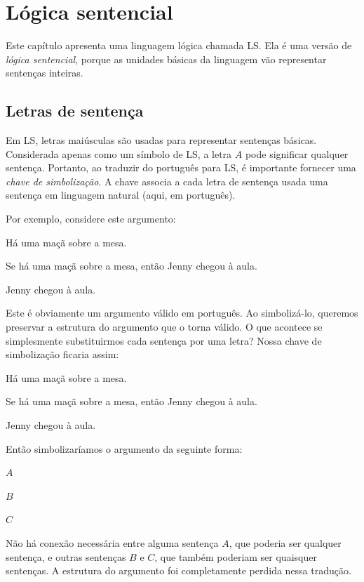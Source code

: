 \chapter{Lógica sentencial}
\label{ch.SL}

Este capítulo apresenta uma linguagem lógica chamada LS. Ela é uma versão de \emph{lógica sentencial}, porque as unidades básicas da linguagem vão representar sentenças inteiras.

\section{Letras de sentença}
Em LS, letras maiúsculas são usadas para representar sentenças básicas. Considerada apenas como um símbolo de LS, a letra $A$ pode significar qualquer sentença. Portanto, ao traduzir do português para LS, é importante fornecer uma \emph{chave de simbolização}. A chave associa a cada letra de sentença usada uma sentença em linguagem natural (aqui, em português).

Por exemplo, considere este argumento:
\begin{earg}
\item[] Há uma maçã sobre a mesa.
\item[] Se há uma maçã sobre a mesa, então Jenny chegou à aula.
\item[\therefore] Jenny chegou à aula.
\end{earg}
Este é obviamente um argumento válido em português. Ao simbolizá-lo, queremos preservar a estrutura do argumento que o torna válido.
O que acontece se simplesmente substituirmos cada sentença por uma letra? Nossa chave de simbolização ficaria assim:
\begin{ekey}
\item[A:] Há uma maçã sobre a mesa.
\item[B:] Se há uma maçã sobre a mesa, então Jenny chegou à aula.
\item[C:] Jenny chegou à aula.
\end{ekey}
Então simbolizaríamos o argumento da seguinte forma:
\begin{earg}
\item[] $A$
\item[] $B$
\item[\therefore] $C$
\end{earg}
Não há conexão necessária entre alguma sentença $A$, que poderia ser qualquer sentença, e outras sentenças $B$ e $C$, que também poderiam ser quaisquer sentenças.
A estrutura do argumento foi completamente perdida nessa tradução.


